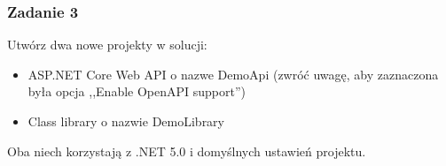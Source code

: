 %
%




\subsubsection{Zadanie 3}
Utwórz dwa nowe projekty w solucji:
\begin{itemize}
	\item ASP.NET Core Web API o nazwe DemoApi (zwróć uwagę, aby zaznaczona była opcja ,,Enable OpenAPI support'')
	\item Class library o nazwie DemoLibrary
\end{itemize}
Oba niech korzystają z .NET 5.0 i domyślnych ustawień projektu.

